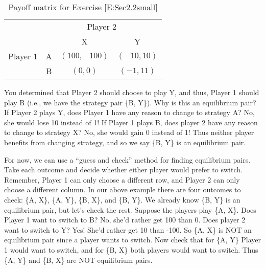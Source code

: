 

\begin{table}[h]
\centering

\begin{tabular}{cccc}
                      & \multicolumn{3}{c}{Player 2}                                                  \\ \cline{2-4} 
\multicolumn{1}{l|}{} & \multicolumn{1}{l|}{} & \multicolumn{1}{c|}{X} & \multicolumn{1}{c|}{Y} \\ \cline{2-4} 
\multicolumn{1}{l|}{Player 1} & \multicolumn{1}{c|}{A} & \multicolumn{1}{c|}{$(100, -100)$} & \multicolumn{1}{c|}{$(-10, 10)$} \\ \cline{2-4} 
\multicolumn{1}{l|}{} & \multicolumn{1}{c|}{B} & \multicolumn{1}{c|}{$(0, 0)$} & \multicolumn{1}{c|}{$(-1, 11)$} \\ \cline{2-4} 
\end{tabular}
\caption{Payoff matrix for Exercise \ref{E:Sec2.2small}}
\end{table}


You determined that Player 2 should choose to play Y, and thus, Player 1 should play B (i.e., we have the strategy pair \{B, Y\}). Why is this an equilibrium pair? If Player 2 plays Y, does Player 1 have any reason to change to strategy A? No, she would lose 10 instead of 1! If Player 1 plays B, does player 2 have any reason to change to strategy X? No, she would gain 0 instead of 1! Thus neither player benefits from changing strategy, and so we say \{B, Y\} is an equilibrium pair. 

For now, we can use a ``guess and check'' method for finding equilibrium pairs. Take each outcome and decide whether either player would prefer to switch. Remember, Player 1 can only choose a different row, and Player 2 can only choose a different column. In our above example there are four outcomes to check: \{A, X\}, \{A, Y\}, \{B, X\}, and \{B, Y\}. We already know \{B, Y\} is an equilibrium pair, but let's check the rest. Suppose the players play \{A, X\}. Does Player 1 want to switch to B? No, she'd rather get 100 than 0. Does player 2 want to switch to Y? Yes! She'd rather get 10 than -100. So \{A, X\} is NOT an equilibrium pair since a player wants to switch. Now check that for \{A, Y\} Player 1 would want to switch, and for \{B, X\} both players would want to switch. Thus \{A, Y\} and \{B, X\} are NOT equilibrium pairs. 
\vspace{.2in}

